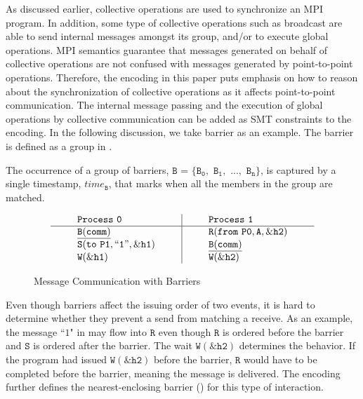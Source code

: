 As discussed earlier, collective operations are used to synchronize an MPI program. In addition, some type of collective operations such as broadcast are able to send internal messages amongst its group, and/or to execute global operations. MPI semantics guarantee that messages generated on behalf of collective operations are not confused with messages generated by point-to-point operations. Therefore, the encoding in this paper puts emphasis on how to reason about the synchronization of collective operations as it affects point-to-point communication. The internal message passing and the execution of global operations by collective communication can be added as SMT constraints to the encoding. In the following discussion, we take barrier as an example. The barrier is defined as a group in . 

\begin{definition}[Barrier]\label{def:barrier}
The occurrence of a group of barriers, $\mathtt{B}$ = $\{\mathtt{B_0},$ $\mathtt{B_1},$ $...,$ $\mathtt{B_n}\}$, is captured by a
single timestamp, $\mathit{time}_\mathtt{B}$, that marks when all the members in the group are matched.  
\end{definition}

\begin{figure}[h]
\[
\begin{array}{l|l}
\;\;\;\;\;\;\;\;\mathtt{Process\ 0}\;\;\;\;\;\;\;\; & \;\;\;\;\;\;\;\; \mathtt{Process\ 1}\;\;\;\;\;\;\;\; \\
\hline
\;\;\;\;\;\;\;\;\mathtt{\underline{B(comm)}}\;\;\;\;\;\;\;\; & \;\;\;\;\;\;\;\; \mathtt{R(from\ P0,A,\&h2)}\;\;\;\;\;\;\;\; \\
\;\;\;\;\;\;\;\;\mathtt{S(to\ P1,``1",\&h1)}\;\;\;\;\;\;\;\; & \;\;\;\;\;\;\;\; \mathtt{\underline{B(comm)}}\;\;\;\;\;\;\;\; \\
\;\;\;\;\;\;\;\;\mathtt{W(\&h1)}\;\;\;\;\;\;\;\; & \;\;\;\;\;\;\;\; \mathtt{W(\&h2)}\;\;\;\;\;\;\;\; \\
\end{array}
\]
\caption{Message Communication with Barriers} \label{fig:mc_barrier1}
\end{figure}

Even though barriers affect the issuing order of two events, it is hard to determine whether they prevent a send from matching a receive. As an example, the message ``$1$" in  may flow into $\mathtt{R}$ even though $\mathtt{R}$ is ordered before the barrier and $\mathtt{S}$ is ordered after the barrier. The wait $\mathtt{W(\&h2)}$ determines the behavior. If the program had issued $\mathtt{W(\&h2)}$ before the barrier, $\mathtt{R}$ would have to be completed before the barrier, meaning the message is delivered. The encoding further defines the nearest-enclosing barrier () for this type of interaction.

